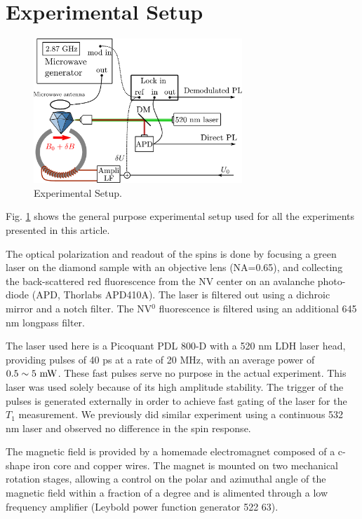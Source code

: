 \documentclass[preprintnumbers,amsmath,amssymb,onecolumn,12pt]{revtex4-2}\usepackage{graphicx}%
\begin{document}
\section{Experimental Setup}
\begin{figure}[h]
\includegraphics[width=0.7\textwidth]{Figures_SI/shema_exp}
\caption{Experimental Setup.}
\label{setup}
\end{figure}
Fig. \ref{setup} shows the general purpose experimental setup used for all the experiments presented in this article.

The optical polarization and readout of the spins is done by focusing a green laser on the diamond sample with an objective lens (NA=0.65), and collecting the back-scattered red fluorescence from the NV center on an avalanche photo-diode (APD, Thorlabs APD410A). The laser is filtered out using a dichroic mirror and a notch filter. The NV$^0$ fluorescence is filtered using an additional 645 nm longpass filter.

The laser used here is a Picoquant PDL 800-D with a 520 nm LDH laser head, providing pulses of 40 ps at a rate of 20 MHz, with an average power of $0.5 \sim 5\ \rm mW$. These fast pulses serve no purpose in the actual experiment. This laser was used solely because of its high amplitude stability. The trigger of the pulses is generated externally in order to achieve fast gating of the laser for the $T_1$ measurement. We previously did similar experiment using a continuous 532 nm laser and observed no difference in the spin response. 

The magnetic field is provided by a homemade electromagnet composed of a c-shape iron core and  copper wires. The magnet is mounted on two mechanical rotation stages, allowing a control on the polar and azimuthal angle of the magnetic field within a fraction of a degree and is alimented through a low frequency amplifier (Leybold power function generator 522 63).
\end{document}
